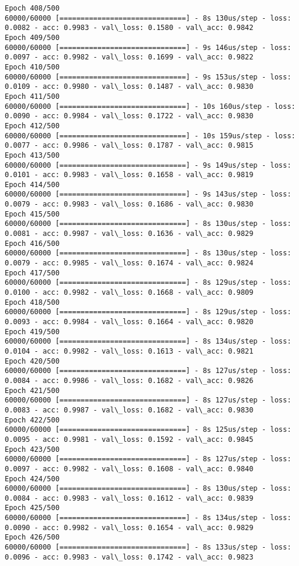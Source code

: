 \documentclass[11pt]{article}
\begin{document}
\begin{Verbatim}[commandchars=\\\{\}]
Epoch 408/500
60000/60000 [==============================] - 8s 130us/step - loss: 0.0082 - acc: 0.9983 - val\_loss: 0.1580 - val\_acc: 0.9842
Epoch 409/500
60000/60000 [==============================] - 9s 146us/step - loss: 0.0097 - acc: 0.9982 - val\_loss: 0.1699 - val\_acc: 0.9822
Epoch 410/500
60000/60000 [==============================] - 9s 153us/step - loss: 0.0109 - acc: 0.9980 - val\_loss: 0.1487 - val\_acc: 0.9830
Epoch 411/500
60000/60000 [==============================] - 10s 160us/step - loss: 0.0090 - acc: 0.9984 - val\_loss: 0.1722 - val\_acc: 0.9830
Epoch 412/500
60000/60000 [==============================] - 10s 159us/step - loss: 0.0077 - acc: 0.9986 - val\_loss: 0.1787 - val\_acc: 0.9815
Epoch 413/500
60000/60000 [==============================] - 9s 149us/step - loss: 0.0101 - acc: 0.9983 - val\_loss: 0.1658 - val\_acc: 0.9819
Epoch 414/500
60000/60000 [==============================] - 9s 143us/step - loss: 0.0079 - acc: 0.9983 - val\_loss: 0.1686 - val\_acc: 0.9830
Epoch 415/500
60000/60000 [==============================] - 8s 130us/step - loss: 0.0081 - acc: 0.9987 - val\_loss: 0.1636 - val\_acc: 0.9829
Epoch 416/500
60000/60000 [==============================] - 8s 130us/step - loss: 0.0079 - acc: 0.9985 - val\_loss: 0.1674 - val\_acc: 0.9824
Epoch 417/500
60000/60000 [==============================] - 8s 129us/step - loss: 0.0100 - acc: 0.9982 - val\_loss: 0.1668 - val\_acc: 0.9809
Epoch 418/500
60000/60000 [==============================] - 8s 129us/step - loss: 0.0093 - acc: 0.9984 - val\_loss: 0.1664 - val\_acc: 0.9820
Epoch 419/500
60000/60000 [==============================] - 8s 134us/step - loss: 0.0104 - acc: 0.9982 - val\_loss: 0.1613 - val\_acc: 0.9821
Epoch 420/500
60000/60000 [==============================] - 8s 127us/step - loss: 0.0084 - acc: 0.9986 - val\_loss: 0.1682 - val\_acc: 0.9826
Epoch 421/500
60000/60000 [==============================] - 8s 127us/step - loss: 0.0083 - acc: 0.9987 - val\_loss: 0.1682 - val\_acc: 0.9830
Epoch 422/500
60000/60000 [==============================] - 8s 125us/step - loss: 0.0095 - acc: 0.9981 - val\_loss: 0.1592 - val\_acc: 0.9845
Epoch 423/500
60000/60000 [==============================] - 8s 127us/step - loss: 0.0097 - acc: 0.9982 - val\_loss: 0.1608 - val\_acc: 0.9840
Epoch 424/500
60000/60000 [==============================] - 8s 130us/step - loss: 0.0084 - acc: 0.9983 - val\_loss: 0.1612 - val\_acc: 0.9839
Epoch 425/500
60000/60000 [==============================] - 8s 134us/step - loss: 0.0090 - acc: 0.9982 - val\_loss: 0.1654 - val\_acc: 0.9829
Epoch 426/500
60000/60000 [==============================] - 8s 133us/step - loss: 0.0096 - acc: 0.9983 - val\_loss: 0.1742 - val\_acc: 0.9823

\end{Verbatim}
\end{document}
